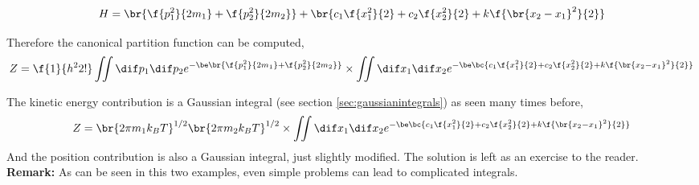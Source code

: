 \documentclass{article}
\begin{document}
\[ H = \br{\f{p_1^2}{2m_1} + \f{p_2^2}{2m_2}} + \br{c_1 \f{x_1^2}{2} + c_2 \f{x_2^2}{2} + k \f{\br{x_2 - x_1}^2}{2}} \]

Therefore the canonical partition function can be computed,
\[ Z = \f{1}{h^2 2!} \iint \dif p_1 \dif p_2 e^{-\be\br{\f{p_1^2}{2m_1} + \f{p_2^2}{2m_2}}} \times \iint \dif x_1 \dif x_2 e^{-\be \bc{c_1 \f{x_1^2}{2} + c_2 \f{x_2^2}{2} + k \f{\br{x_2 - x_1}^2}{2}}} \]

The kinetic energy contribution is a Gaussian integral (see section \ref{sec:gaussianintegrals}) as seen many times before,
\[ Z = \br{2\pi m_1 k_B T}^{1/2}\br{2\pi m_2 k_B T}^{1/2} \times \iint \dif x_1 \dif x_2 e^{-\be \bc{c_1 \f{x_1^2}{2} + c_2 \f{x_2^2}{2} + k \f{\br{x_2 - x_1}^2}{2}}} \]
And the position contribution is also a Gaussian integral, just slightly modified. The solution is left as an exercise to the reader. \\

\textbf{Remark:} As can be seen in this two examples, even simple problems can lead to complicated integrals. \\
\end{document}
